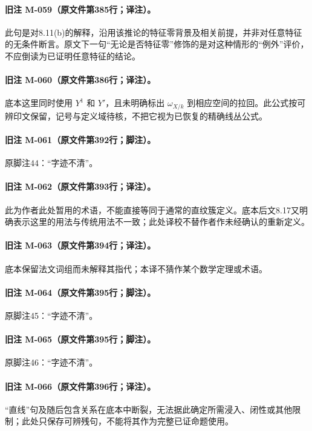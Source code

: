 \documentclass[UTF8,a4paper]{ctexbook}
\begin{document}
\paragraph{旧注 M-059（原文件第385行；译注）。}
此句是对8.11(b)的解释，沿用该推论的特征零背景及相关前提，并非对任意特征的无条件断言。原文下一句“无论是否特征零”修饰的是对这种情形的“例外”评价，不应倒读为已证明任意特征的结论。

\paragraph{旧注 M-060（原文件第386行；译注）。}
底本这里同时使用 $Y^1$ 和 $Y'$，且未明确标出 $\omega_{X/k}$ 到相应空间的拉回。此公式按可辨印文保留，记号与定义域待核，不把它视为已恢复的精确线丛公式。

\paragraph{旧注 M-061（原文件第392行；脚注）。}
原脚注44：“字迹不清”。

\paragraph{旧注 M-062（原文件第393行；译注）。}
此为作者此处暂用的术语，不能直接等同于通常的直纹簇定义。底本后文8.17又明确表示这里的用法与传统用法不一致；此处译校不替作者作未经确认的重新定义。

\paragraph{旧注 M-063（原文件第394行；译注）。}
底本保留法文词组而未解释其指代；本译不猜作某个数学定理或术语。

\paragraph{旧注 M-064（原文件第395行；脚注）。}
原脚注45：“字迹不清”。

\paragraph{旧注 M-065（原文件第395行；脚注）。}
原脚注46：“字迹不清”。

\paragraph{旧注 M-066（原文件第396行；译注）。}
“直线”句及随后包含关系在底本中断裂，无法据此确定所需浸入、闭性或其他限制；此处只保存可辨残句，不能将其作为完整已证命题使用。
\end{document}
